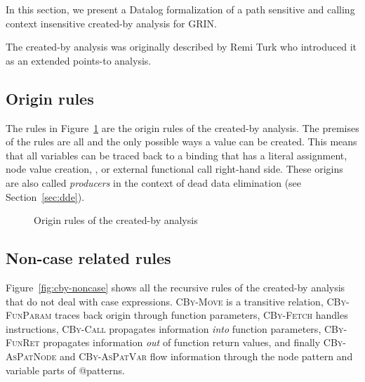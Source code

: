 \documentclass[main.tex]{subfiles}
\begin{document}
  In this section, we present a Datalog formalization of a path sensitive and calling context insensitive created-by analysis for GRIN.
  
  The created-by analysis was originally described by Remi Turk \cite{remi-masters} who introduced it as an extended points-to analysis. 
  
  \subsection{Origin rules}
  
  The rules in Figure~\ref{fig:cby-origins} are the origin rules of the created-by analysis. The premises of the rules are all and the only possible ways a value can be created. This means that all variables can be traced back to a binding that has a literal assignment, node value creation, ,  or external functional call right-hand side. These origins are also called \emph{producers} in the context of dead data elimination (see Section~\ref{sec:dde}).

  \begin{figure}[h]
  \caption{Origin rules of the created-by analysis}
  \label{fig:cby-origins}
  \end{figure}

	\subsection{Non-case related rules}
	
	Figure~\ref{fig:cby-noncase} shows all the recursive rules of the created-by analysis that do not deal with case expressions. \textsc{CBy-Move} is a transitive relation, \textsc{CBy-FunParam} traces back origin through function parameters, \textsc{CBy-Fetch} handles  instructions, \textsc{CBy-Call} propagates information \emph{into} function parameters, \textsc{CBy-FunRet} propagates information \emph{out} of function return values, and finally \textsc{CBy-AsPatNode} and \textsc{CBy-AsPatVar} flow information through the node pattern and variable parts of @patterns. 
\end{document}
